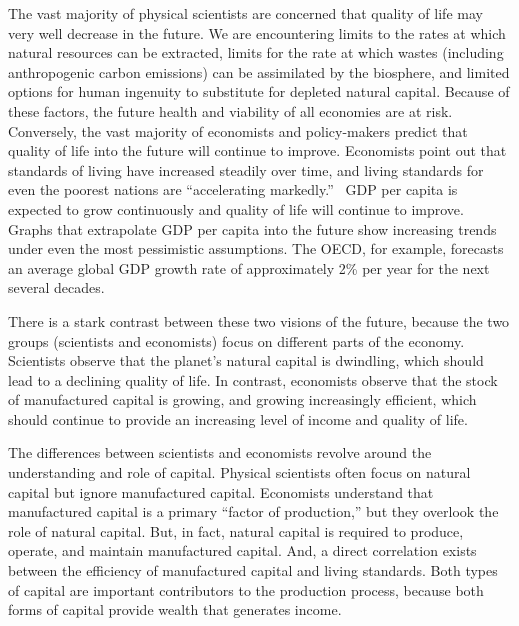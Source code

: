 
The vast majority of physical scientists are concerned that 
quality of life may very well decrease in the future. 
We are encountering 
limits to the rates at which natural resources can be extracted, 
limits for the rate at which wastes (including anthropogenic carbon emissions) 
can be assimilated by the biosphere, and
limited options for human ingenuity to substitute 
for depleted natural capital. 
Because of these factors, 
the future health and viability of all economies are at risk.\cite{IPCC2013} 
Conversely, the vast majority of economists and policy-makers predict 
that quality of life into the future will continue to improve. 
Economists point out that standards of living have increased steadily over time,
and living standards for even the poorest nations 
are ``accelerating markedly.''~\cite{Malik:2013aa} 
GDP per capita is expected to
grow continuously and quality of life will continue to improve. 
Graphs that extrapolate GDP per capita into the future show increasing
trends under even the most pessimistic assumptions.\cite[p.~170]{Malik:2013aa} 
The OECD, for example, forecasts an average global GDP
growth rate of approximately 2\% per year 
for the next several decades.\cite[Table A.1]{OECD2012}

There is a stark contrast between these two visions of the future, 
because the two groups (scientists and economists) focus on 
different parts of the economy.
Scientists observe that the planet's natural capital is dwindling, 
which should lead to a declining quality of life.
In contrast, economists observe that the stock of manufactured capital is growing, 
and growing increasingly efficient, which
should continue to provide an increasing level of income and quality of life. 

The differences between scientists and economists revolve around 
the understanding and role of capital.
Physical scientists often focus on natural capital but ignore manufactured capital. 
Economists understand that manufactured capital is a primary ``factor of production,'' 
but they overlook the role of natural capital. 
But, in fact, natural capital is required 
to produce, operate, and maintain manufactured capital. 
And, a direct correlation exists between the efficiency of manufactured capital
and living standards.
Both types of capital are important contributors to the production process, 
because both forms of capital provide wealth that generates income. 

